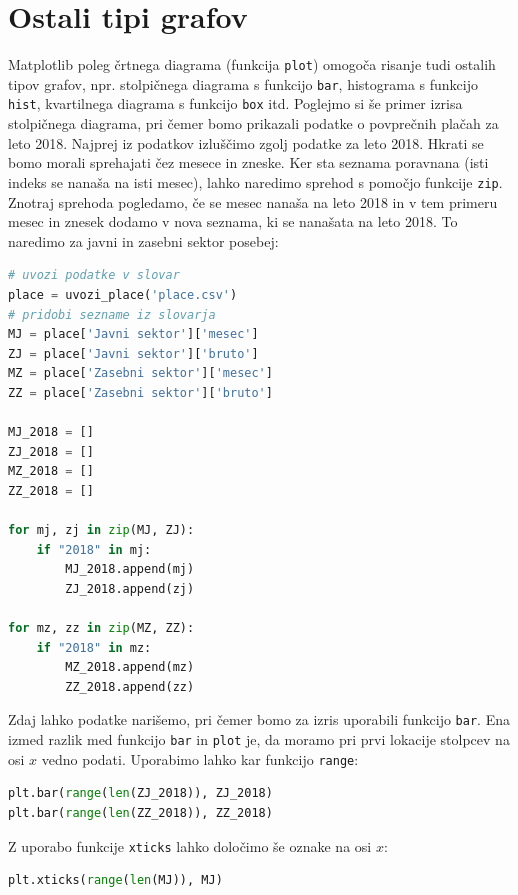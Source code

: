 \section{Ostali tipi grafov}

Matplotlib poleg črtnega diagrama (funkcija \texttt{plot}) omogoča risanje tudi ostalih tipov grafov, npr. stolpičnega diagrama  s funkcijo \texttt{bar}, histograma s funkcijo \texttt{hist}, kvartilnega diagrama s funkcijo \texttt{box} itd. Poglejmo si še primer izrisa stolpičnega diagrama, pri čemer bomo prikazali podatke o povprečnih plačah za leto 2018. Najprej iz podatkov izluščimo zgolj podatke za leto 2018. Hkrati se bomo morali sprehajati čez mesece in zneske. Ker sta seznama poravnana (isti indeks se nanaša na isti mesec), lahko naredimo sprehod s pomočjo funkcije \texttt{zip}. Znotraj sprehoda pogledamo, če se mesec nanaša na leto 2018 in v tem primeru mesec in znesek dodamo v nova seznama, ki se nanašata na leto 2018. To naredimo za javni in zasebni sektor posebej:
\begin{lstlisting}[language=Python, showstringspaces=false]
# uvozi podatke v slovar
place = uvozi_place('place.csv')
# pridobi sezname iz slovarja
MJ = place['Javni sektor']['mesec']
ZJ = place['Javni sektor']['bruto']
MZ = place['Zasebni sektor']['mesec']
ZZ = place['Zasebni sektor']['bruto']

MJ_2018 = []
ZJ_2018 = []
MZ_2018 = []
ZZ_2018 = []

for mj, zj in zip(MJ, ZJ):
    if "2018" in mj:
        MJ_2018.append(mj)
        ZJ_2018.append(zj)

for mz, zz in zip(MZ, ZZ):
    if "2018" in mz:
        MZ_2018.append(mz)
        ZZ_2018.append(zz)
\end{lstlisting}

Zdaj lahko podatke narišemo, pri čemer bomo za izris uporabili funkcijo \texttt{bar}. Ena izmed razlik med funkcijo \texttt{bar} in \texttt{plot} je, da moramo pri prvi lokacije stolpcev na osi $x$ vedno podati. Uporabimo lahko kar funkcijo \texttt{range}:
\begin{lstlisting}[language=Python, showstringspaces=false]
plt.bar(range(len(ZJ_2018)), ZJ_2018)
plt.bar(range(len(ZZ_2018)), ZZ_2018)
\end{lstlisting}

Z uporabo funkcije \texttt{xticks} lahko določimo še oznake na osi $x$:
\begin{lstlisting}[language=Python, showstringspaces=false]
plt.xticks(range(len(MJ)), MJ)
\end{lstlisting}

